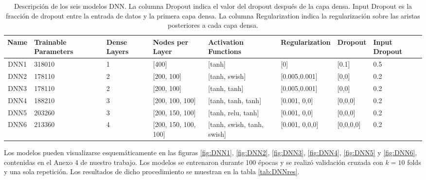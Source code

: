 \documentclass[11pt]{article}
\begin{document}
\begin{table}[H]
    \centering
    \begin{tabular}{c| p{1.5cm}| p{1cm}| p{2cm}| p{3.5cm}| p{2.5cm} | p{1.5cm}| p{1cm}}
        \toprule
        Name &  Trainable Parameters &  Dense Layers & Nodes per Layer &  Activation Functions &  Regularization & Dropout & Input Dropout \\
        \midrule
        DNN1 &  318010 & 1 & [400] & [tanh] & [0] & [0.1] & 0.5 \\
        DNN2 &  178110 & 2 & [200, 100] & [tanh, swish] & [0.005,0.001] & [0,0] & 0.2 \\
        DNN3 &  178110 & 2 & [200, 100] & [tanh, tanh] & [0.005,0.001] & [0,0] & 0.2 \\
        DNN4 &  188210 & 3 & [200, 100, 100] & [tanh, tanh, tanh] & [0.001, 0,0] & [0,0,0] & 0.2 \\
        DNN5 &  203260 & 3 & [200, 150, 100] & [tanh, relu, tanh] & [0.001, 0,0] & [0,0,0] & 0.2 \\
        DNN6 &  213360 & 4 & [200, 150, 100, 100] & [tanh, swish, tanh, swish] & [0.001, 0,0,0] & [0,0,0,0] & 0.2 \\
        \bottomrule
    \end{tabular}
    \caption{Descripción de los seis modelos DNN. La columna Dropout indica el valor del dropout después de la capa densa. Input Dropout es la fracción de dropout entre la entrada de datos y la primera capa densa. La columna Regularization indica la regularización sobre las aristas posteriores a cada capa densa.}
    \label{tab:DNNdes}
\end{table}
Los modelos pueden visualizarse esquemáticamente en las figuras \ref{fig:DNN1}, \ref{fig:DNN2}, \ref{fig:DNN3}, \ref{fig:DNN4}, \ref{fig:DNN5} y \ref{fig:DNN6}, contenidas en el Anexo 4 de nuestro trabajo. Los modelos se entrenaron durante 100 épocas y se realizó validación cruzada con $k=10$ folds y una sola repetición. Los resultados de dicho procedimiento se muestran en la tabla \ref{tab:DNNres}.
\end{document}
